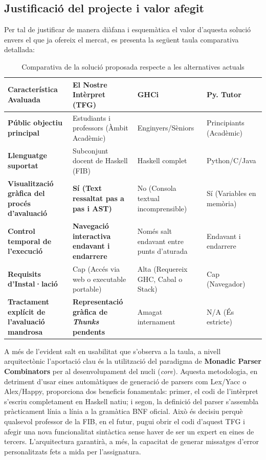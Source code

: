 \subsection{Justificació del projecte i valor afegit}
Per tal de justificar de manera diàfana i esquemàtica el valor d'aquesta solució envers el que ja ofereix el mercat, es presenta la següent taula comparativa detallada:

\begin{table}[H]
\centering
\caption{Comparativa de la solució proposada respecte a les alternatives actuals}
\begin{tabularx}{\textwidth}{@{}p{4.5cm}XXX@{}}
\toprule
\textbf{Característica Avaluada} & \textbf{El Nostre Intèrpret (TFG)} & \textbf{GHCi} & \textbf{Py. Tutor} \\ \midrule
\textbf{Públic objectiu principal} & Estudiants i professors (Àmbit Acadèmic) & Enginyers/Sèniors & Principiants (Acadèmic) \\
\textbf{Llenguatge suportat} & Subconjunt docent de Haskell (FIB) & Haskell complet & Python/C/Java \\
\textbf{Visualització gràfica del procés d'avaluació} & \textbf{Sí (Text ressaltat pas a pas i AST)} & No (Consola textual incomprensible) & Sí (Variables en memòria) \\
\textbf{Control temporal de l'execució} & \textbf{Navegació interactiva endavant i endarrere} & Només salt endavant entre punts d'aturada & Endavant i endarrere \\
\textbf{Requisits d'Instal·lació} & Cap (Accés via web o executable portable) & Alta (Requereix GHC, Cabal o Stack) & Cap (Navegador) \\
\textbf{Tractament explícit de l'avaluació mandrosa} & \textbf{Representació gràfica de \textit{Thunks} pendents} & Amagat internament & N/A (És estricte) \\ \bottomrule
\end{tabularx}
\end{table}

A més de l'evident salt en usabilitat que s'observa a la taula, a nivell arquitectònic l'aportació clau és la utilització del paradigma de \textbf{Monadic Parser Combinators} \cite{hutton1998monadic, leijen2001parsec} per al desenvolupament del nucli (\textit{core}). Aquesta metodologia, en detriment d'usar eines automàtiques de generació de parsers com Lex/Yacc o Alex/Happy, proporciona dos beneficis fonamentals: primer, el codi de l'intèrpret s'escriu completament en Haskell natiu; i segon, la definició del parser s'assembla pràcticament línia a línia a la gramàtica BNF oficial. Això és decisiu perquè qualsevol professor de la FIB, en el futur, pugui obrir el codi d'aquest TFG i afegir una nova funcionalitat sintàctica sense haver de ser un expert en eines de tercers. L'arquitectura garantirà, a més, la capacitat de generar missatges d'error personalitzats fets a mida per l'assignatura.

